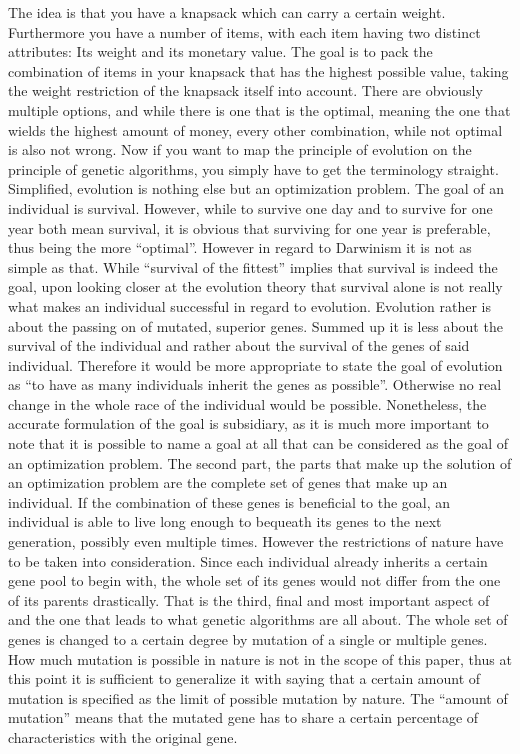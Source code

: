 \documentclass[11pt,a4paper]{article}
\begin{document}
The idea is that you have a knapsack which can carry a certain weight. Furthermore you have a number of items, with each item having two distinct attributes: Its weight and its monetary value. The goal is to pack the combination of items in your knapsack that has the highest possible value, taking the weight restriction of the knapsack itself into account.
There are obviously multiple options, and while there is one that is the optimal, meaning the one that wields the highest amount of money, every other combination, while not optimal is also not wrong.
Now if you want to map the principle of evolution on the principle of genetic algorithms, you simply have to get the terminology straight. Simplified, evolution is nothing else but an optimization problem. The goal of an individual is survival. However, while to survive one day and to survive for one year both mean survival, it is obvious that surviving for one year is preferable, thus being the more “optimal”. However in regard to Darwinism it is not as simple as that. While “survival of the fittest” implies that survival is indeed the goal, upon looking closer at the evolution theory that survival alone is not really what makes an individual successful in regard to evolution. Evolution rather is about the passing on of mutated, superior genes. Summed up it is less about the survival of the individual and rather about the survival of the genes of said individual.
Therefore it would be more appropriate to state the goal of evolution as “to have as many individuals inherit the genes as possible”. Otherwise no real change in the whole race of the individual would be possible.
Nonetheless, the accurate formulation of the goal is subsidiary, as it is much more important to note that it is possible to name a goal at all that can be considered as the goal of an optimization problem.
The second part, the parts that make up the solution of an optimization problem are the complete set of genes that make up an individual. If the combination of these genes is beneficial to the goal, an individual is able to live long enough to bequeath its genes to the next generation, possibly even multiple times. However the restrictions of nature have to be taken into consideration. Since each individual already inherits a certain gene pool to begin with, the whole set of its genes would not differ from the one of its parents drastically. 
That is the third, final and most important aspect of and the one that leads to what genetic algorithms are all about. The whole set of genes is changed to a certain degree by mutation of a single or multiple genes. How much mutation is possible in nature is not in the scope of this paper, thus at this point it is sufficient to generalize it with saying that a certain amount of mutation is specified as the limit of possible mutation by nature. The “amount of mutation” means that the mutated gene has to share a certain percentage of characteristics with the original gene.
\end{document}
